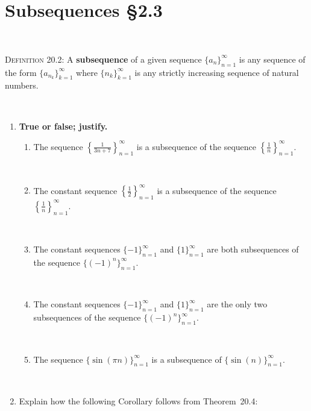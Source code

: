 \documentclass[12pt]{amsart}
\begin{document}
	
	\thispagestyle{empty}
	
	\section*{Subsequences \S 2.3}

	\



\begin{framed}
\noindent \textsc{Definition 20.2:} A \textbf{subsequence} of a given sequence
  $\{a_n\}_{n=1}^\infty$ is any sequence of the form $\{a_{n_k}\}_{k=1}^\infty$
where 
$\{n_k\}_{k=1}^\infty$
is any strictly increasing sequence of natural numbers.\end{framed}

\

\begin{enumerate}
 \item \textbf{True or false; justify.}
\begin{enumerate} 
\item The sequence $\displaystyle \left\{ \frac{1}{3n+7} \right\}_{n=1}^\infty$ is a subsequence of the sequence $\displaystyle \left\{ \frac{1}{n} \right\}_{n=1}^\infty$.

\

\item The constant sequence $\displaystyle \left\{ \frac{1}{2} \right\}_{n=1}^\infty$ is a subsequence of the sequence $\displaystyle \left\{ \frac{1}{n} \right\}_{n=1}^\infty$.

\

\item The constant sequences $\{ -1 \}_{n=1}^\infty$ and  $\{ 1 \}_{n=1}^\infty$ are both subsequences of the sequence $\{ (-1)^n \}_{n=1}^\infty$.

\

\item The constant sequences $\{ -1 \}_{n=1}^\infty$ and  $\{ 1 \}_{n=1}^\infty$ are the only two subsequences of the sequence $\{ (-1)^n \}_{n=1}^\infty$.

\

\item The sequence $\{ \sin(\pi n) \}_{n=1}^\infty$ is a subsequence of $\{ \sin(n) \}_{n=1}^\infty$.

\end{enumerate}

\

\item Explain how the following Corollary follows from Theorem~20.4:


\end{enumerate}
\end{document}
